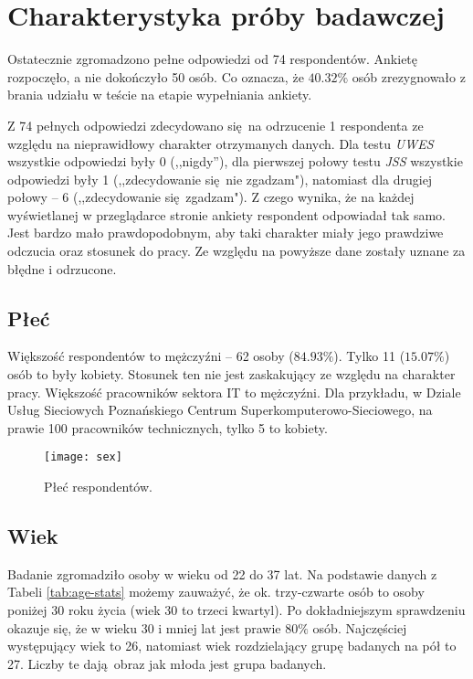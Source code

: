 \section{Charakterystyka próby badawczej} 
\label{sec:group}
Ostatecznie zgromadzono pełne odpowiedzi od 74 respondentów. Ankietę rozpoczęło, a nie dokończyło 50 osób. Co oznacza, że $40.32\%$ osób zrezygnowało z brania udziału w teście na etapie wypełniania ankiety. 

Z 74 pełnych odpowiedzi zdecydowano się na odrzucenie 1 respondenta ze względu na nieprawidłowy charakter otrzymanych danych. Dla testu \emph{UWES} wszystkie odpowiedzi były 0 (,,nigdy''), dla pierwszej połowy testu \emph{JSS} wszystkie odpowiedzi były 1 (,,zdecydowanie się nie zgadzam"), natomiast dla drugiej połowy -- 6 (,,zdecydowanie się zgadzam"). Z czego wynika, że na każdej wyświetlanej w przeglądarce stronie ankiety respondent odpowiadał tak samo. Jest bardzo mało
prawdopodobnym, aby taki charakter miały jego prawdziwe odczucia oraz stosunek do pracy. Ze względu na powyższe dane zostały uznane za błędne i odrzucone.
\subsection{Płeć}
Większość respondentów to mężczyźni -- 62 osoby ($84.93\%$). Tylko 11 ($15.07\%$) osób to były kobiety. Stosunek ten nie jest zaskakujący ze względu na charakter pracy. Większość pracowników sektora IT to mężczyźni. Dla przykładu, w Dziale Usług Sieciowych Poznańskiego Centrum Superkomputerowo-Sieciowego, na prawie 100 pracowników technicznych, tylko 5 to kobiety.

\begin{figure}[h]
\begin{center}
\texttt{[image: sex]}
\end{center}
\caption{Płeć respondentów.}
\label{fig:sex}
\end{figure}

\subsection{Wiek}
\label{sec:group-age}

Badanie zgromadziło osoby w wieku od 22 do 37 lat. Na podstawie danych z Tabeli \ref{tab:age-stats} możemy zauważyć, że ok. trzy-czwarte osób to osoby poniżej 30 roku życia (wiek 30 to trzeci kwartyl). Po dokładniejszym sprawdzeniu okazuje się, że w wieku 30 i mniej lat jest prawie $80\%$ osób.  Najczęściej występujący wiek to 26, natomiast wiek rozdzielający grupę badanych na pół to 27. Liczby te dają obraz jak młoda jest grupa badanych. 

